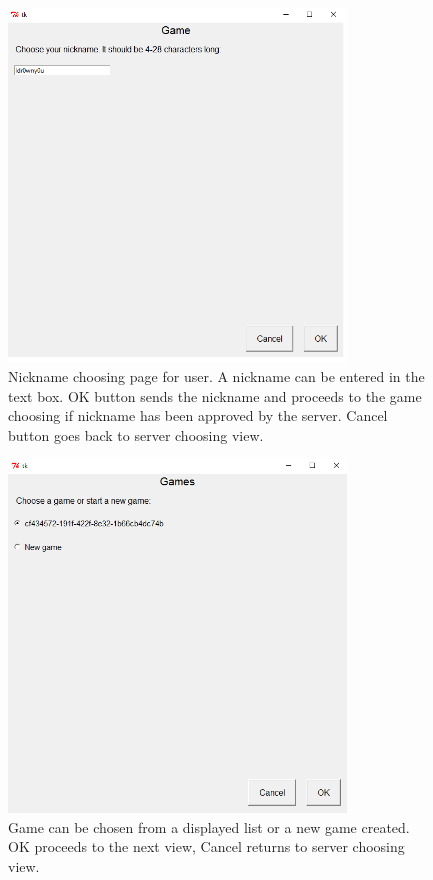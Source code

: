 \documentclass[]{article}
\begin{document}
\begin{figure}[!hbt]
	\centering
	\includegraphics[width=0.8\textwidth]{NickPage.png}
	\caption{Nickname choosing page for user. A nickname can be entered in the text box. OK button sends the nickname and proceeds to the game choosing if nickname has been approved by the server. Cancel button goes back to server choosing view.}
	\label{fig:Nickpage}
\end{figure}

\begin{figure}[!hbt]
	\centering
	\includegraphics[width=0.8\textwidth]{ChooseGame.png}
	\caption{Game can be chosen from a displayed list or a new game created. OK proceeds to the next view, Cancel returns to server choosing view.}
	\label{fig:Choosegame}
\end{figure}
\end{document}
